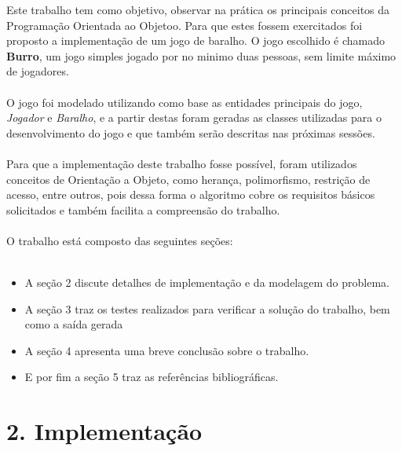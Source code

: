 \documentclass[12pt, a4paper]{article}
\begin{document}
  Este trabalho tem como objetivo, observar na prática os principais conceitos da Programação Orientada ao Objetoo. Para que estes fossem exercitados foi proposto a implementação de um jogo de baralho. O jogo escolhido é chamado \textbf{Burro}, um jogo simples jogado por no minimo duas pessoas, sem limite máximo de jogadores.
  \\\\
  O jogo foi modelado utilizando como base as entidades principais do jogo, \textit{Jogador} e \textit{Baralho}, e a partir destas foram geradas as classes utilizadas para o desenvolvimento do jogo e que também serão descritas nas próximas sessões.
  \\\\
  Para que a implementação deste trabalho fosse possível, foram utilizados conceitos de Orientação a Objeto, como herança, polimorfismo, restrição de acesso, entre outros, pois dessa forma o algoritmo cobre os requisitos básicos solicitados e também facilita a compreensão do trabalho.
  \\\\
  O trabalho está composto das seguintes seções:\\\\
  \begin{itemize}
    \item A seção 2 discute detalhes de implementação e da modelagem do problema.
    \item A seção 3 traz os testes realizados para verificar a solução do trabalho, bem como a saída gerada
    \item A seção 4 apresenta uma breve conclusão sobre o trabalho.
    \item E por fim a seção 5 traz as referências bibliográficas.
  \end{itemize}

\section*{2. Implementação}
\end{document}
